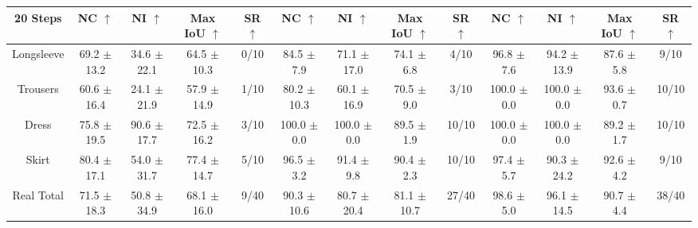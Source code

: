 \documentclass[journal]{IEEEtran}
\begin{document}
\begin{table}[t!]
{\begin{tabular}{c|cccc|cccc||cccc}
\hline
\hline
20 Steps 
& NC $\uparrow$  & NI $\uparrow$ & Max IoU $\uparrow$    & SR  $\uparrow$ 
& NC $\uparrow$  & NI $\uparrow$ & Max IoU $\uparrow$     & SR  $\uparrow$ 
& NC $\uparrow$  & NI $\uparrow$ & Max IoU $\uparrow$    & SR  $\uparrow$ \\
\hline
Longsleeve & 69.2 $\pm$ 13.2 & 34.6 $\pm$ 22.1 & 64.5 $\pm$ 10.3 & 0/10 & 84.5 $\pm$ 7.9 & 71.1 $\pm$ 17.0 & 74.1 $\pm$ 6.8 & 4/10 & 96.8 $\pm$ 7.6 & 94.2 $\pm$ 13.9 & 87.6 $\pm$ 5.8 & 9/10 \\
Trousers & 60.6 $\pm$ 16.4 & 24.1 $\pm$ 21.9 & 57.9 $\pm$ 14.9 & 1/10 & 80.2 $\pm$ 10.3 & 60.1 $\pm$ 16.9 & 70.5 $\pm$ 9.0 & 3/10 & 100.0 $\pm$ 0.0 & 100.0 $\pm$ 0.0 & 93.6 $\pm$ 0.7 & 10/10 \\
Dress & 75.8 $\pm$ 19.5 & 90.6 $\pm$ 17.7 & 72.5 $\pm$ 16.2 & 3/10 & 100.0 $\pm$ 0.0 & 100.0 $\pm$ 0.0 & 89.5 $\pm$ 1.9 & 10/10 & 100.0 $\pm$ 0.0 & 100.0 $\pm$ 0.0 & 89.2 $\pm$ 1.7 & 10/10 \\
Skirt & 80.4 $\pm$ 17.1 & 54.0 $\pm$ 31.7 & 77.4 $\pm$ 14.7 & 5/10 & 96.5 $\pm$ 3.2 & 91.4 $\pm$ 9.8 & 90.4 $\pm$ 2.3 & 10/10 & 97.4 $\pm$ 5.7 & 90.3 $\pm$ 24.2 & 92.6 $\pm$ 4.2 & 9/10 \\
\hline
Real Total & 71.5 $\pm$ 18.3 & 50.8 $\pm$ 34.9 & 68.1 $\pm$ 16.0 & 9/40 & 90.3 $\pm$ 10.6 & 80.7 $\pm$ 20.4 & 81.1 $\pm$ 10.7 & 27/40 & 98.6 $\pm$ 5.0 & 96.1 $\pm$ 14.5 & 90.7 $\pm$ 4.4 & 38/40 \\
\bottomrule
\end{tabular}%
}
\end{table}
\end{document}
